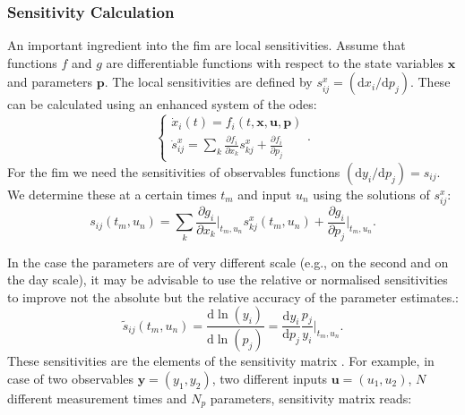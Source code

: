 \documentclass[10pt,A4paper]{article}
\newcommand{\mbx}{\mathbf{x}}
\newcommand{\mbu}{\mathbf{u}}
\newcommand{\mbp}{\mathbf{p}}
\newcommand{\mby}{\mathbf{y}}
\begin{document}
%
\subsubsection*{Sensitivity Calculation}
An important ingredient into the \ac{fim} are local sensitivities. 
Assume that functions $f$ and $g$ are differentiable functions with respect to the state variables $\mbx$ and parameters $\mbp$. 
The local sensitivities are defined by $s^x_{ij} = (\mathrm{d} x_i / \mathrm{d} p_j )$. 
These can be calculated using an enhanced system of the \acp{ode}:
\begin{equation}
    \begin{cases}
    \dot x_i (t) = f_i(t, \mbx, \mbu, \mbp)\\
    \dot s^x_{ij} = \sum_k \frac{\partial f_i}{\partial x_k} s^x_{kj} + \frac{\partial f_i}{\partial p_j}
    \end{cases}.
\label{eq:ode_and_sensitiv}
\end{equation} 
For the \ac{fim} we need the sensitivities of observables functions $(\mathrm{d} y_i / \mathrm{d} p_j) = s_{ij}$. 
We determine these at a certain times $t_m$ and input $u_n$ using the solutions of $s^x_{ij}$:
\begin{equation}
    s_{ij} (t_m, u_n) = \sum_k \frac{\partial g_i}{\partial x_k}\bigg|_{t_m, u_n} s_{kj}^x (t_m, u_n) + \frac{\partial g_i}{\partial p_j}\bigg|_{t_m, u_n}.
\label{eq:observ_sensitivities}
\end{equation}

In the case the parameters are of very different scale (e.g., on the second and on the day scale), it may be advisable to use the relative or normalised sensitivities to improve not the absolute but the relative accuracy of the parameter estimates.: 
\begin{equation}
    \tilde{s}_{ij} (t_m, u_n) =\frac{\mathrm{d}\ln(y_i)}{\mathrm{d}\ln(p_j)} = \frac{\mathrm{d} y_i}{\mathrm{d} p_j} \frac{p_j}{y_i}\bigg|_{t_m, u_n}.
\label{eq:relat_sensitivities}
\end{equation}
These sensitivities are the elements of the sensitivity matrix \cite{stigterObservabilityComplex2017}. 
For example, in case of two observables $\mby = (y_1, y_2)$, two different inputs $\mbu = (u_1, u_2)$, $N$ different measurement times and $N_p$ parameters, sensitivity matrix reads:
\end{document}
